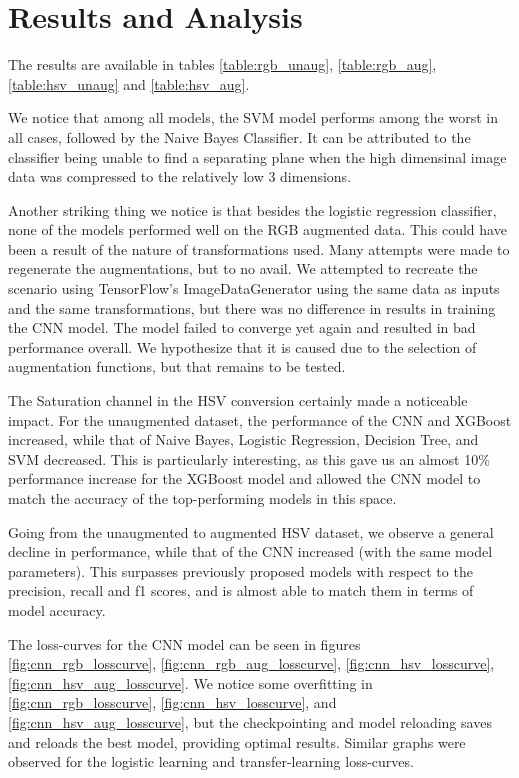 \documentclass[10pt,twocolumn,letterpaper]{article}
\begin{document}
\section{Results and Analysis}
The results are available in tables \ref{table:rgb_unaug}, \ref{table:rgb_aug}, \ref{table:hsv_unaug} and \ref{table:hsv_aug}.

We notice that among all models, the SVM model performs among the worst in all cases, followed by the Naive Bayes Classifier. It can be attributed to the classifier being unable to find a separating plane when the high dimensinal image data was compressed to the relatively low 3 dimensions.

Another striking thing we notice is that besides the logistic regression classifier, none of the models performed well on the RGB augmented data. This could have been a result of the nature of transformations used. Many attempts were made to regenerate the augmentations, but to no avail. We attempted to recreate the scenario using TensorFlow's ImageDataGenerator using the same data as inputs and the same transformations, but there was no difference in results in training the CNN model. The model failed to converge yet again and resulted in bad performance overall. We hypothesize that it is caused due to the selection of augmentation functions, but that remains to be tested.

The Saturation channel in the HSV conversion certainly made a noticeable impact. For the unaugmented dataset, the performance of the CNN and XGBoost increased, while that of Naive Bayes, Logistic Regression, Decision Tree, and SVM decreased. This is particularly interesting, as this gave us an almost 10\% performance increase for the XGBoost model and allowed the CNN model to match the accuracy of the top-performing models in this space.

Going from the unaugmented to augmented HSV dataset, we observe a general decline in performance, while that of the CNN increased (with the same model parameters). This surpasses previously proposed models with respect to the precision, recall and f1 scores, and is almost able to match them in terms of model accuracy.

The loss-curves for the CNN model can be seen in figures \ref{fig:cnn_rgb_losscurve}, \ref{fig:cnn_rgb_aug_losscurve}, \ref{fig:cnn_hsv_losscurve}, \ref{fig:cnn_hsv_aug_losscurve}. We notice some overfitting in \ref{fig:cnn_rgb_losscurve}, \ref{fig:cnn_hsv_losscurve}, and \ref{fig:cnn_hsv_aug_losscurve}, but the checkpointing and model reloading saves and reloads the best model, providing optimal results. Similar graphs were observed for the logistic learning and transfer-learning loss-curves.
\end{document}
